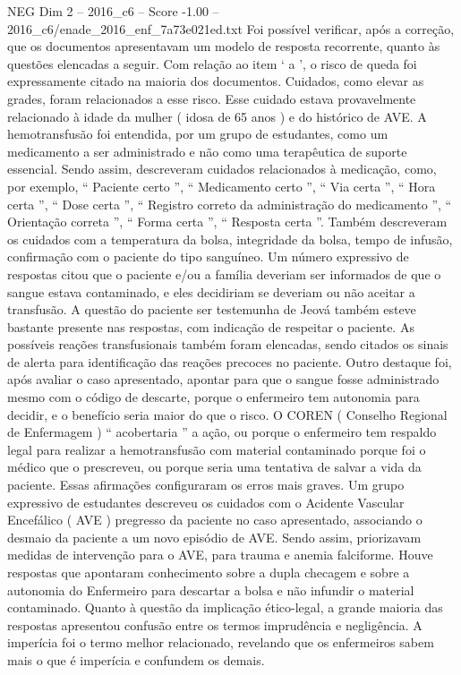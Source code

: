 \begin{textsample}{NEG Dim 2 – 2016\_c6 – Score -1.00 – 2016\_c6/enade\_2016\_enf\_7a73e021ed.txt}
Foi possível verificar, após a correção, que os documentos apresentavam um modelo de resposta recorrente, quanto às questões elencadas a seguir.
Com relação ao item ‘ a ’, o risco de queda foi expressamente citado na maioria dos documentos.
Cuidados, como elevar as grades, foram relacionados a esse risco.
Esse cuidado estava provavelmente relacionado à idade da mulher ( idosa de 65 anos ) e do histórico de AVE.
A hemotransfusão foi entendida, por um grupo de estudantes, como um medicamento a ser administrado e não como uma terapêutica de suporte essencial.
Sendo assim, descreveram cuidados relacionados à medicação, como, por exemplo, “ Paciente certo ”, “ Medicamento certo ”, “ Via certa ”, “ Hora certa ”, “ Dose certa ”, “ Registro correto da administração do medicamento ”, “ Orientação correta ”, “ Forma certa ”, “ Resposta certa ”.
Também descreveram os cuidados com a temperatura da bolsa, integridade da bolsa, tempo de infusão, confirmação com o paciente do tipo sanguíneo.
Um número expressivo de respostas citou que o paciente e/ou a família deveriam ser informados de que o sangue estava contaminado, e eles decidiriam se deveriam ou não aceitar a transfusão.
A questão do paciente ser testemunha de Jeová também esteve bastante presente nas respostas, com indicação de respeitar o paciente.
As possíveis reações transfusionais também foram elencadas, sendo citados os sinais de alerta para identificação das reações precoces no paciente.
Outro destaque foi, após avaliar o caso apresentado, apontar para que o sangue fosse administrado mesmo com o código de descarte, porque o enfermeiro tem autonomia para decidir, e o benefício seria maior do que o risco.
O COREN ( Conselho Regional de Enfermagem ) “ acobertaria ” a ação, ou porque o enfermeiro tem respaldo legal para realizar a hemotransfusão com material contaminado porque foi o médico que o prescreveu, ou porque seria uma tentativa de salvar a vida da paciente.
Essas afirmações configuraram os erros mais graves.
Um grupo expressivo de estudantes descreveu os cuidados com o Acidente Vascular Encefálico ( AVE ) pregresso da paciente no caso apresentado, associando o desmaio da paciente a um novo episódio de AVE.
Sendo assim, priorizavam medidas de intervenção para o AVE, para trauma e anemia falciforme.
Houve respostas que apontaram conhecimento sobre a dupla checagem e sobre a autonomia do Enfermeiro para descartar a bolsa e não infundir o material contaminado.
Quanto à questão da implicação ético-legal, a grande maioria das respostas apresentou confusão entre os termos imprudência e negligência.
A imperícia foi o termo melhor relacionado, revelando que os enfermeiros sabem mais o que é imperícia e confundem os demais.

\end{textsample}
